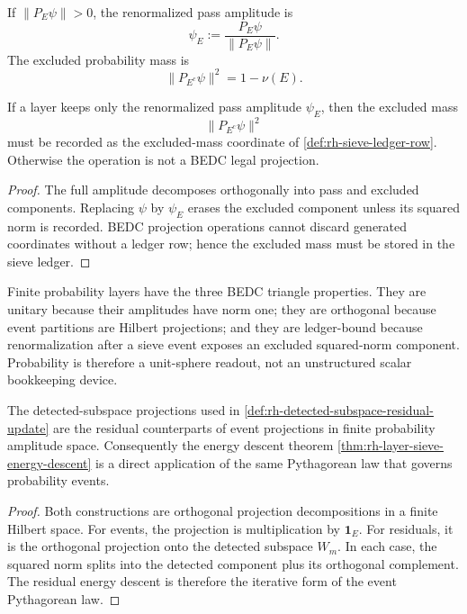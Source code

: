 \begin{definition}
\label{def:rh-renormalized-pass-amplitude}
If $\|P_E\psi\|>0$, the renormalized pass amplitude is
$$
\psi_E:=\frac{P_E\psi}{\|P_E\psi\|}.
$$
The excluded probability mass is
$$
\|P_{E^c}\psi\|^2=1-\nu(E).
$$
\end{definition}

\begin{theorem}
\label{thm:rh-discarded-probability-mass-ledger-data}
If a layer keeps only the renormalized pass amplitude $\psi_E$, then
the excluded mass
$$
\|P_{E^c}\psi\|^2
$$
must be recorded as the excluded-mass coordinate of
\autoref{def:rh-sieve-ledger-row}.  Otherwise the operation is not a
BEDC legal projection.
\end{theorem}

\begin{proof}
The full amplitude decomposes orthogonally into pass and excluded
components.  Replacing $\psi$ by $\psi_E$ erases the excluded component
unless its squared norm is recorded.  BEDC projection operations cannot
discard generated coordinates without a ledger row; hence the excluded
mass must be stored in the sieve ledger.
\end{proof}

\begin{principle}
\label{prin:rh-probability-bedc-triangle-properties}
Finite probability layers have the three BEDC triangle properties.
They are unitary because their amplitudes have norm one; they are
orthogonal because event partitions are Hilbert projections; and they
are ledger-bound because renormalization after a sieve event exposes an
excluded squared-norm component.  Probability is therefore a unit-sphere
readout, not an unstructured scalar bookkeeping device.
\end{principle}

\begin{theorem}
\label{thm:rh-amplitude-geometry-supports-cofinal-sieve-dissipation}
The detected-subspace projections used in
\autoref{def:rh-detected-subspace-residual-update} are the residual
counterparts of event projections in finite probability amplitude
space.  Consequently the energy descent theorem
\autoref{thm:rh-layer-sieve-energy-descent} is a direct application of
the same Pythagorean law that governs probability events.
\end{theorem}

\begin{proof}
Both constructions are orthogonal projection decompositions in a finite
Hilbert space.  For events, the projection is multiplication by
$\mathbf 1_E$.  For residuals, it is the orthogonal projection onto the
detected subspace $W_m$.  In each case, the squared norm splits into the
detected component plus its orthogonal complement.  The residual energy
descent is therefore the iterative form of the event Pythagorean law.
\end{proof}
